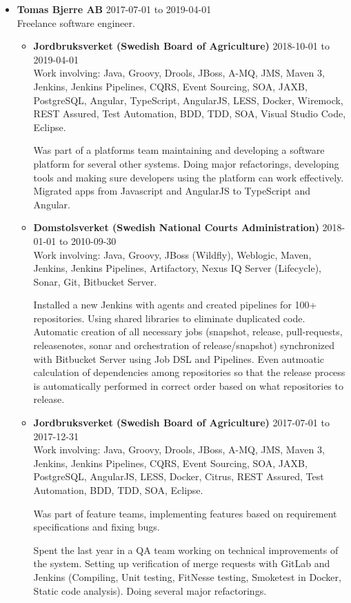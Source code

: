\documentclass[a4paper]{article}
\begin{document}
\begin{itemize}
 \item \textbf{Tomas Bjerre AB} 2017-07-01 to 2019-04-01 \\
 Freelance software engineer.
 \begin{itemize}
  \item \textbf{Jordbruksverket (Swedish Board of Agriculture)} 2018-10-01 to 2019-04-01 \\
  Work involving: Java, Groovy, Drools, JBoss, A-MQ, JMS, Maven 3, Jenkins, Jenkins Pipelines, CQRS, Event Sourcing, SOA, JAXB, PostgreSQL, Angular, TypeScript, AngularJS, LESS, Docker, Wiremock, REST Assured, Test Automation, BDD, TDD, SOA, Visual Studio Code, Eclipse.

  Was part of a platforms team maintaining and developing a software platform for several other systems. Doing major refactorings, developing tools and making sure developers using the platform can work effectively. Migrated apps from Javascript and AngularJS to TypeScript and Angular.

  \item \textbf{Domstolsverket (Swedish National Courts Administration)} 2018-01-01 to 2010-09-30 \\
  Work involving: Java, Groovy, JBoss (Wildfly), Weblogic, Maven, Jenkins, Jenkins Pipelines, Artifactory, Nexus IQ Server (Lifecycle), Sonar, Git, Bitbucket Server.

  Installed a new Jenkins with agents and created pipelines for 100+ repositories. Using shared libraries to eliminate duplicated code. Automatic creation of all necessary jobs (snapshot, release, pull-requests, releasenotes, sonar and orchestration of release/snapshot) synchronized with Bitbucket Server using Job DSL and Pipelines. Even autmoatic calculation of dependencies among repositories so that the release process is automatically performed in correct order based on what repositories to release.
  \item \textbf{Jordbruksverket (Swedish Board of Agriculture)} 2017-07-01 to 2017-12-31 \\
  Work involving: Java, Groovy, Drools, JBoss, A-MQ, JMS, Maven 3, Jenkins, Jenkins Pipelines, CQRS, Event Sourcing, SOA, JAXB, PostgreSQL, AngularJS, LESS, Docker, Citrus, REST Assured, Test Automation, BDD, TDD, SOA, Eclipse.

  Was part of feature teams, implementing features based on requirement specifications and fixing bugs.

  Spent the last year in a QA team working on technical improvements of the system. Setting up verification of merge requests with GitLab and Jenkins (Compiling, Unit testing, FitNesse testing, Smoketest in Docker, Static code analysis). Doing several major refactorings.
 \end{itemize}
\end{itemize}
  
\end{document}
